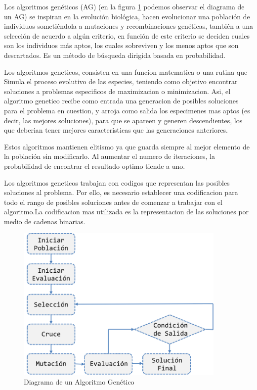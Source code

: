Los algoritmos genéticos (AG) (en la figura \ref{diagrama} podemos observar el diagrama de un AG) se inspiran en la evolución biológica, hacen evolucionar una población de individuos sometiéndola a mutaciones y recombinaciones genéticas, también a una selección de acuerdo a algún criterio, en función de este criterio se deciden cuales son los individuos más aptos, los cuales sobreviven y los menos aptos que son descartados. Es un método de búsqueda dirigida basada en probabilidad.\cite{back1996evolutionary}

Los algoritmos geneticos, consisten en una funcion matematica o una rutina que Simula el proceso evolutivo de las especies, teniendo como objetivo encontrar soluciones a problemas especificos de maximizacion o minimizacion. Asi, el algoritmo genetico recibe como entrada una generacion de posibles soluciones para el problema en cuestion, y arroja como salida los especimenes mas aptos (es decir, las mejores soluciones), para que se apareen y generen descendientes, los que deberian tener mejores caracteristicas que las generaciones anteriores.

Estos algoritmos mantienen elitismo ya que guarda siempre al mejor elemento de la población sin modificarlo. Al aumentar el numero de iteraciones, la probabilidad de encontrar el resultado optimo tiende a uno.

Los algoritmos geneticos trabajan con codigos que representan las posibles soluciones al problema. Por ello, es necesario establecer una codificacion para todo el rango de posibles soluciones antes de comenzar a trabajar con el algoritmo.La codificacion mas utilizada es la representacion de las soluciones por medio de cadenas binarias.\cite{parisi2004modelos}

\begin{figure}[htp]
  \centerline{\includegraphics[width=4in]{diagrama.png}} 
  \caption{Diagrama de un Algoritmo Genético} 
\label{diagrama}
\end{figure}

